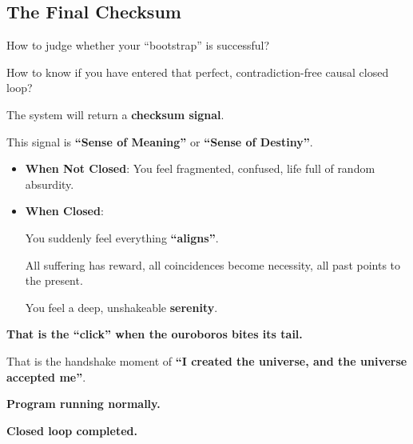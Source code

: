 \subsection{The Final Checksum}

How to judge whether your ``bootstrap'' is successful?

How to know if you have entered that perfect, contradiction-free causal closed loop?

The system will return a \textbf{checksum signal}.

This signal is \textbf{``Sense of Meaning''} or \textbf{``Sense of Destiny''}.

\begin{itemize}
\item \textbf{When Not Closed}: You feel fragmented, confused, life full of random absurdity.

\item \textbf{When Closed}:

You suddenly feel everything \textbf{``aligns''}.

All suffering has reward, all coincidences become necessity, all past points to the present.

You feel a deep, unshakeable \textbf{serenity}.
\end{itemize}

\textbf{That is the ``click'' when the ouroboros bites its tail.}

That is the handshake moment of \textbf{``I created the universe, and the universe accepted me''}.

\textbf{Program running normally.}

\textbf{Closed loop completed.}

